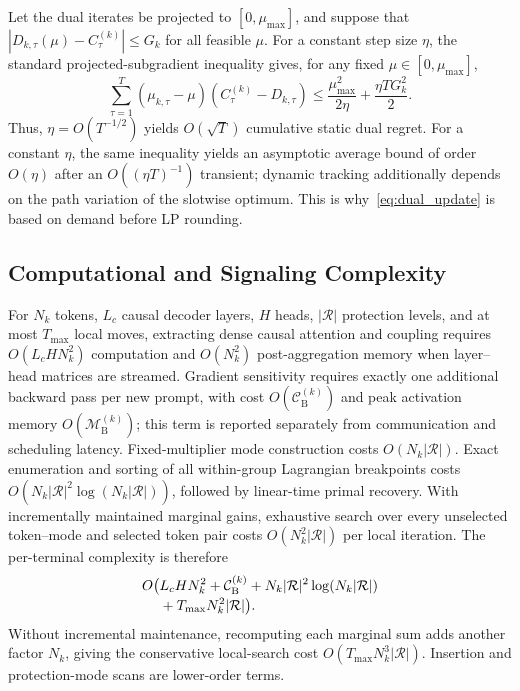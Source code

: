 \documentclass[journal]{IEEEtran}
\begin{document}
Let the dual iterates be projected to $[0,\mu_{\max}]$, and suppose that
$|D_{k,\tau}(\mu)-C_{\tau}^{(k)}|\leq G_k$ for all feasible $\mu$. For a constant step size $\eta$, the standard projected-subgradient inequality gives, for any fixed $\mu\in[0,\mu_{\max}]$,
\begin{equation}
\sum_{\tau=1}^{T}
(\mu_{k,\tau}-\mu)
(C_{\tau}^{(k)}-D_{k,\tau})
\leq\frac{\mu_{\max}^2}{2\eta}
+\frac{\eta TG_k^2}{2}.
\label{eq:dual_regret}
\end{equation}
Thus, $\eta=O(T^{-1/2})$ yields $O(\sqrt T)$ cumulative static dual regret. For a constant $\eta$, the same inequality yields an asymptotic average bound of order $O(\eta)$ after an $O((\eta T)^{-1})$ transient; dynamic tracking additionally depends on the path variation of the slotwise optimum. This is why~\eqref{eq:dual_update} is based on demand before LP rounding.

\subsection{Computational and Signaling Complexity}

For $N_k$ tokens, $L_c$ causal decoder layers, $H$ heads, $|\mathcal R|$ protection levels, and at most $T_{\max}$ local moves, extracting dense causal attention and coupling requires $O(L_cHN_k^2)$ computation and $O(N_k^2)$ post-aggregation memory when layer--head matrices are streamed. Gradient sensitivity requires exactly one additional backward pass per new prompt, with cost $O(\mathcal C_{\mathrm B}^{(k)})$ and peak activation memory $O(\mathcal M_{\mathrm B}^{(k)})$; this term is reported separately from communication and scheduling latency. Fixed-multiplier mode construction costs $O(N_k|\mathcal R|)$. Exact enumeration and sorting of all within-group Lagrangian breakpoints costs $O(N_k|\mathcal R|^2\log(N_k|\mathcal R|))$, followed by linear-time primal recovery. With incrementally maintained marginal gains, exhaustive search over every unselected token--mode and selected token pair costs $O(N_k^2|\mathcal R|)$ per local iteration. The per-terminal complexity is therefore
\begin{align}
O\big(&L_cHN_k^2+\mathcal C_{\mathrm B}^{(k)}
+N_k|\mathcal R|^2\log(N_k|\mathcal R|)
\notag\\[-0.2em]
&+T_{\max}N_k^2|\mathcal R|\big).
\label{eq:complexity}
\end{align}
Without incremental maintenance, recomputing each marginal sum adds another factor $N_k$, giving the conservative local-search cost $O(T_{\max}N_k^3|\mathcal R|)$. Insertion and protection-mode scans are lower-order terms.
\end{document}
